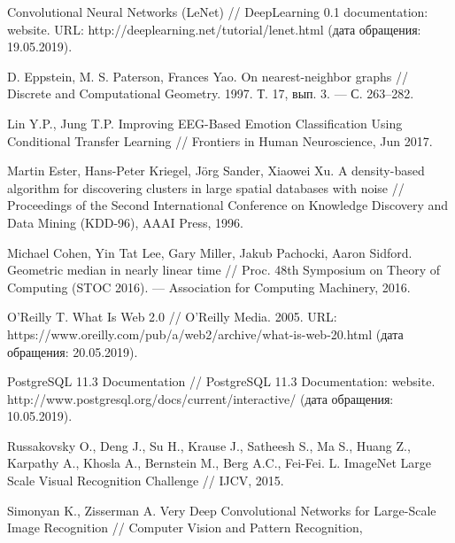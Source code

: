 \begingroup 
\renewcommand{\section}[2]{\anonsection{Библиографический список}}
\begin{thebibliography}{00}

    Convolutional Neural Networks (LeNet) // 
    DeepLearning 0.1 documentation: website. 
    URL: http://deeplearning.net/tutorial/lenet.html 
    (дата обращения: 19.05.2019).

    D. Eppstein, M. S. Paterson, Frances Yao. 
    On nearest-neighbor graphs // 
    Discrete and Computational Geometry. 
    1997. Т. 17, вып. 3. — С. 263–282.

    Lin Y.P., Jung T.P.
    Improving EEG-Based Emotion Classification Using Conditional Transfer Learning //
    Frontiers in Human Neuroscience, 
    Jun 2017.

    Martin Ester, Hans-Peter Kriegel, Jörg Sander, Xiaowei Xu.
    A density-based algorithm for discovering clusters in large spatial databases with noise // 
    Proceedings of the Second International Conference on Knowledge Discovery and Data Mining (KDD-96),
    AAAI Press, 
    1996.

    Michael Cohen, Yin Tat Lee, Gary Miller, Jakub Pachocki, Aaron Sidford. 
    Geometric median in nearly linear time // 
    Proc. 48th Symposium on Theory of Computing (STOC 2016). — Association for Computing Machinery, 
    2016.

    O'Reilly T. What Is Web 2.0 // 
    O’Reilly Media. 
    2005. 
    URL: https://www.oreilly.com/pub/a/web2/archive/what-is-web-20.html 
    (дата обращения: 20.05.2019).

    PostgreSQL 11.3 Documentation // 
    PostgreSQL 11.3 Documentation: website. 
    http://www.postgresql.org/docs/current/interactive/
    (дата обращения: 10.05.2019).

    Russakovsky O., Deng J., Su H., Krause J., Satheesh S., Ma S., Huang Z., Karpathy A., Khosla A., Bernstein M., Berg A.C., Fei-Fei. L. 
    ImageNet Large Scale Visual Recognition Challenge // 
    IJCV, 
    2015.

    Simonyan K., Zisserman A. 
    Very Deep Convolutional Networks for Large-Scale Image Recognition // 
    Computer Vision and Pattern Recognition, 


\end{thebibliography}
